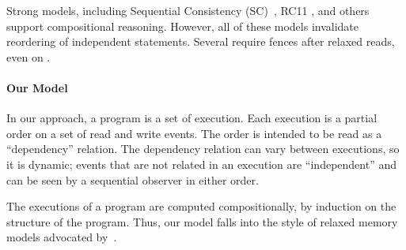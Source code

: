 

Strong models, including Sequential Consistency
(SC)~\citep{Lamport:1979:MMC:1311099.1311750}, RC11
\citep{DBLP:conf/pldi/LahavVKHD17}, and others
\citep{Dolan:2018:BDR:3192366.3192421,DBLP:conf/pldi/LahavVKHD17,DBLP:conf/lics/JeffreyR16,Boehm:2014:OGA:2618128.2618134}
support compositional reasoning.  However, all of these models invalidate
reordering of independent statements.  Several require fences after relaxed
reads, even on \armeight.


\paragraph{Our Model}

In our approach, a program is a set of execution.  Each execution is a
partial order on a set of read and write events.  The order is intended to be
read as a ``dependency'' relation.  The dependency relation can vary between
executions, so it is dynamic; events that are not related in an execution are
``independent'' and can be seen by a sequential observer in either order.

The executions of a program are computed compositionally, by induction on the
structure of the program.  Thus, our model falls into the style of relaxed
memory models advocated by~\citet{Batty17}.

